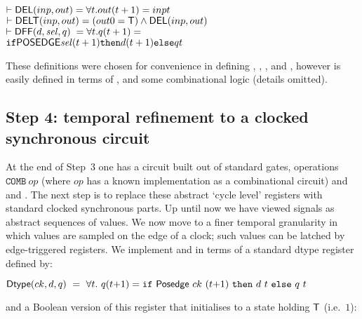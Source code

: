 \documentclass{llncs}
\begin{document}
\vspace*{-1mm}

{\begin{alltt}
\( \vdash \DEF{DEL}(inp,out)  = {\forall}t. out(t+1) = inp t                       \)
\( \vdash \DEF{DELT}(inp,out) = (out 0 = \DEF{T}) \wedge \DEF{DEL}(inp,out)                       \)
\( \vdash \DEF{DFF}(d,\VAR{sel},q)  \phantom{\hspace*{1mm}}= {\forall}t. q(t+1) = \)
\(                        \texttt{if} \DEF{POSEDGE} \VAR{sel} (t+1) \texttt{then} d(t+1) \texttt{else} q t \)
\end{alltt}}

\vspace*{-1mm}

These definitions were chosen for convenience in defining
, , ,  and ,
however  is easily defined in terms of
,  and some combinational logic (details omitted).

\vspace*{-3mm}

\subsection*{Step 4: temporal refinement to a clocked synchronous circuit}

At the end of Step~3 one has a circuit built out of standard gates,
operations $\texttt{COMB}~op$ (where $op$ has a known implementation as
a combinational circuit) and  and .  The
next step is to replace these abstract `cycle level' registers with
standard clocked synchronous parts. Up until now we have viewed
signals as abstract sequences of values.  We now move to a finer
temporal granularity in which values are sampled on the edge of a
clock; such values can be latched by edge-triggered registers. We
implement  and  in terms of a standard dtype
register defined by:

\vspace*{1mm}

$\mathsf{Dtype}(ck,d,q) ~=~ \forall t.~q(t{+}1) = \texttt{if}~\mathsf{Posedge}~ck~(t{+}1)~\texttt{then}~d~t~\texttt{else}~q~t$

\vspace*{1mm}

\noindent and a Boolean version of this register that initialises to a state holding $\mathsf{T}$ (i.e.~$1$):

\vspace*{1mm}
\end{document}
